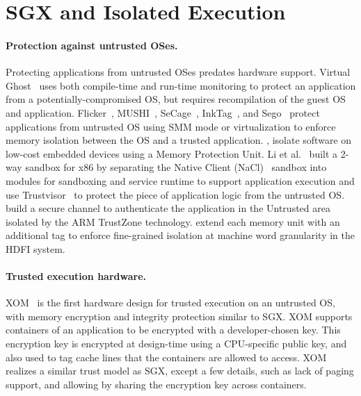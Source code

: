 \section{SGX and Isolated Execution}
\label{sec:related:sgx}

%
%
%


\paragraph{Protection against untrusted OSes.}
Protecting applications from untrusted OSes predates hardware support. 
Virtual Ghost~\cite{criswell2014virtualghost} uses both compile-time and run-time monitoring to protect an application
from a potentially-compromised OS, but requires recompilation of the guest OS and application.
Flicker~\cite{flicker}, MUSHI~\cite{zhang2012mushi}, SeCage~\cite{liu15secage}, InkTag~\cite{inktag}, and Sego~\cite{kwon16sego-sigops} protect applications from untrusted OS using SMM mode or virtualization
to enforce memory isolation between the OS and a trusted application.
\citet{koeberl2014trustlite}, isolate software on low-cost embedded devices using a Memory Protection Unit.
Li et al.~\cite{li2014minibox} built a 2-way sandbox for x86 by separating the Native Client (NaCl)~\cite{yee2009native} sandbox into modules for sandboxing and service runtime to support application execution and use Trustvisor~\cite{trustvisor} to protect the piece of application logic from the untrusted OS.
\citet{jang2015secret} build a secure channel to authenticate the application in the Untrusted area isolated by the ARM TrustZone technology.
\citet{songhdfi} extend each memory unit with an additional tag
to enforce fine-grained isolation at machine word granularity in the HDFI system.

\paragraph{Trusted execution hardware.}
XOM~\cite{lie2003implementing} is the first hardware design for trusted execution on an untrusted OS,
with memory encryption and integrity protection similar to SGX. XOM supports containers of an application to be encrypted with a developer-chosen key. This encryption key is encrypted at design-time using a CPU-specific public key, and also used to tag cache lines that the containers are allowed to access.
XOM realizes a similar trust model as SGX, except a few details, such as lack of paging support, and allowing  by sharing the encryption key across containers.

